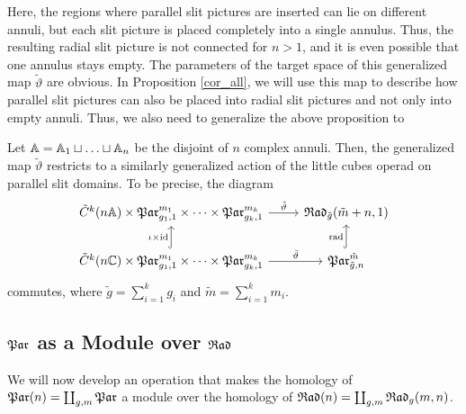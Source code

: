 Here, the regions where parallel slit pictures are inserted can lie on different annuli, but each slit picture is placed completely into a single annulus.
Thus, the resulting radial slit picture is not connected for $n > 1$, and it is even possible that one annulus stays empty.
The parameters of the target space of this generalized map $\tilde \vartheta$ are obvious.
In Proposition \ref{cor_all}, we will use this map to describe how parallel slit pictures can also be placed into radial slit pictures and not only into empty annuli.
Thus, we also need to generalize the above proposition to

\begin{prop}
\label{rad_par_operad_gen}
    Let $\mathbb A = \mathbb A_1 \sqcup \dotsc \sqcup \mathbb A_n$ be the disjoint of $n$ complex annuli.
    Then, the generalized map $\tilde \vartheta$ restricts to a similarly generalized action of the little cubes operad on parallel slit domains.
    To be precise, the diagram
    \[
    \begin{tikzcd}
       \tilde C^k(n\A) \times \mathfrak{Par}_{g_1, 1}^{m_1} \times \dotsb \times \mathfrak{Par}_{g_k, 1}^{m_k} \arrow{r}{\tilde \vartheta} & \Radt_{\tilde g}(\tilde m + n, 1) \\
       \tilde C^k(n\C) \times \mathfrak{Par}_{g_1, 1}^{m_1} \times \dotsb \times \mathfrak{Par}_{g_k, 1}^{m_k} \arrow{r}{\tilde \vartheta} \arrow[hookrightarrow]{u}{\iota \times \text{id}} & \mathfrak{Par}_{\tilde g, n}^{\tilde m} \arrow[hookrightarrow]{u}{\radmap}
    \end{tikzcd}
   \]
   commutes, where $\tilde g = \sum_{i = 1}^{k} g_i$ and $\tilde m = \sum_{i = 1}^k m_i$. 
\end{prop}

\subsection{\texorpdfstring{$\mathfrak{Par}$}{Par} as a Module over \texorpdfstring{$\mathfrak{Rad}$}{Rad}}
\label{par_as_rad_module}

We will now develop an operation that makes the homology of $\mathfrak{Par}(n) = \coprod_{g, m} \mathfrak{Par}$ a module over the homology of $\mathfrak{Rad}(n) = \coprod_{g, m} {\mathfrak{Rad}_g(m,n)}$.

